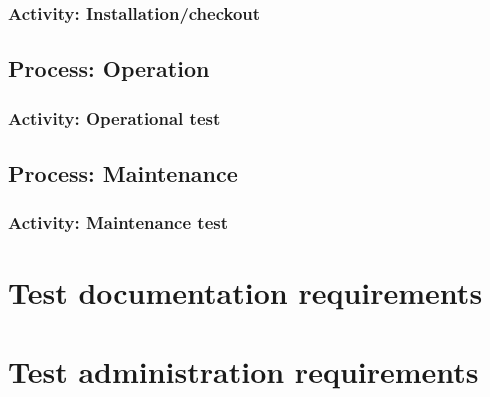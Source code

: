 	\subsubsection{Activity: Installation/checkout} \label{s:details-of-the-master-test-plan:activity-installation-checkout}
	
	\subsection{Process: Operation} \label{s:details-of-the-master-test-plan:process-operation}
	
	\subsubsection{Activity: Operational test} \label{s:details-of-the-master-test-plan:activity-operational-test}
	
	\subsection{Process: Maintenance} \label{s:details-of-the-master-test-plan:process-maintenance}
	
	\subsubsection{Activity: Maintenance test} \label{s:details-of-the-master-test-plan:activity-maintenance-testb}
	
\section{Test documentation requirements} \label{s:details-of-the-master-test-plan:test-documentation-requirements}
	\begin{comment}
		$<$Define the purpose, format, and content of all other testing documents that are to be used (in addition to those that are defined in MTP Section 2.4). A description of these documents may be found in Clause 9 through Clause 16. If the test effort uses test documentation or test levels different from those in this standard (i.e., component, component integration, system, and acceptance), this section needs to map the documentation and process requirements to the test documentation contents defined in this standard. $>$
	\end{comment}

\section{Test administration requirements} \label{s:details-of-the-master-test-plan:test-administration-requirements}
	\begin{comment}
		$<$ Describe the anomaly resolution and reporting processes, task iteration policy, deviation policy, control procedures and standards, practices, and conventions. These activities are needed to administer the tests during execution. $>$
	\end{comment}

